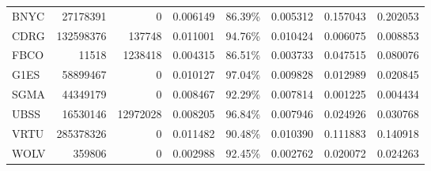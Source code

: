 \documentclass[12pt,a4paper]{extarticle}
\begin{document}
\begin{landscape}
\begin{table}[h]
\begin{tabular}{@{}lrrrrrrr@{}}
      	 	BNYC &          27178391 &               0 &      0.006149 &    86.39\% &      0.005312 &    0.157043 &  0.202053 \\
      	 	CDRG &         132598376 &          137748 &      0.011001 &    94.76\% &      0.010424 &    0.006075 &  0.008853 \\
      	 	FBCO &             11518 &         1238418 &      0.004315 &    86.51\% &      0.003733 &    0.047515 &  0.080076 \\
      	 	G1ES &          58899467 &               0 &      0.010127 &    97.04\% &      0.009828 &    0.012989 &  0.020845 \\
      	 	SGMA &          44349179 &               0 &      0.008467 &    92.29\% &      0.007814 &    0.001225 &  0.004434 \\
      	 	UBSS &          16530146 &        12972028 &      0.008205 &    96.84\% &      0.007946 &    0.024926 &  0.030768 \\
      	 	VRTU &         285378326 &               0 &      0.011482 &    90.48\% &      0.010390 &    0.111883 &  0.140918 \\
      	 	WOLV &            359806 &               0 &      0.002988 &    92.45\% &      0.002762 &    0.020072 &  0.024263 \\
			\bottomrule
		\end{tabular}
		
	\end{table}

\end{landscape}

\pagebreak
\end{document}
